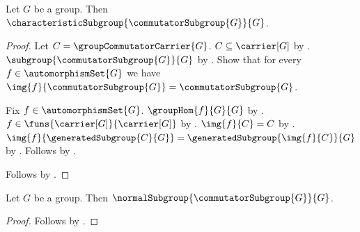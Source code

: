 \begin{theorem}\label{commutator_subgroup_characteristic}
    Let $G$ be a group.
    Then $\characteristicSubgroup{\commutatorSubgroup{G}}{G}$.
\end{theorem}
\begin{proof}
    Let $C=\groupCommutatorCarrier{G}$.
    $C\subseteq\carrier[G]$ by
        .
    $\subgroup{\commutatorSubgroup{G}}{G}$ by
        .
    Show that for every $f\in\automorphismSet{G}$ we have
        $\img{f}{\commutatorSubgroup{G}}=\commutatorSubgroup{G}$.
    \begin{subproof}
        Fix $f\in\automorphismSet{G}$.
        $\groupHom{f}{G}{G}$ by .
        $f\in\funs{\carrier[G]}{\carrier[G]}$ by
            .
        $\img{f}{C}=C$ by
            .
        $\img{f}{\generatedSubgroup{C}{G}}=
            \generatedSubgroup{\img{f}{C}}{G}$ by
            .
        Follows by .
    \end{subproof}
    Follows by .
\end{proof}

\begin{corollary}\label{commutator_subgroup_normal}
    Let $G$ be a group.
    Then $\normalSubgroup{\commutatorSubgroup{G}}{G}$.
\end{corollary}
\begin{proof}
    Follows by
        .
\end{proof}

